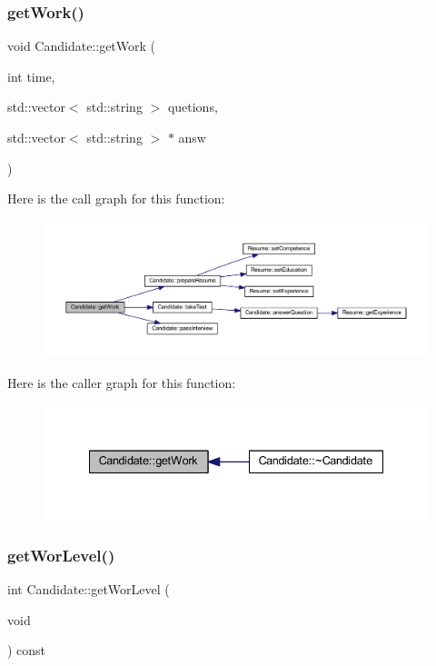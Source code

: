 \subsubsection{\texorpdfstring{get\+Work()}{getWork()}}
{\footnotesize\ttfamily void Candidate\+::get\+Work (\begin{DoxyParamCaption}\item[{int}]{time,  }\item[{std\+::vector$<$ std\+::string $>$}]{quetions,  }\item[{std\+::vector$<$ std\+::string $>$ $\ast$}]{answ }\end{DoxyParamCaption})}

Here is the call graph for this function\+:
\nopagebreak
\begin{figure}[H]
\begin{center}
\leavevmode
\includegraphics[width=350pt]{class_candidate_a50e84cbce900de9863aefb0f5f4a6f68_cgraph}
\end{center}
\end{figure}
Here is the caller graph for this function\+:
\nopagebreak
\begin{figure}[H]
\begin{center}
\leavevmode
\includegraphics[width=335pt]{class_candidate_a50e84cbce900de9863aefb0f5f4a6f68_icgraph}
\end{center}
\end{figure}
\hypertarget{class_candidate_aa6971bae134029ced1180e77bc3662ae}{}\label{class_candidate_aa6971bae134029ced1180e77bc3662ae} 
\subsubsection{\texorpdfstring{get\+Wor\+Level()}{getWorLevel()}}
{\footnotesize\ttfamily int Candidate\+::get\+Wor\+Level (\begin{DoxyParamCaption}\item[{void}]{ }\end{DoxyParamCaption}) const\hspace{0.3cm}{\ttfamily [inline]}}

